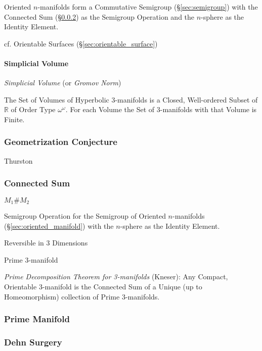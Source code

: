 Oriented $n$-manifolds form a Commutative
Semigroup (\S\ref{sec:semigroup}) with the Connected Sum
(\S\ref{sec:connected_sum}) as the Semigroup Operation and the $n$-sphere as
the Identity Element.

cf. Orientable Surfaces (\S\ref{sec:orientable_surface})



\paragraph{Simplicial Volume}\label{sec:simplicial_volume}\hfill

\emph{Simplicial Volume} (or \emph{Gromov Norm})

The Set of Volumes of Hyperbolic 3-manifolds is a Closed, Well-ordered
Subset of $\mathbb{R}$ of Order Type $\omega^\omega$. For each Volume
the Set of 3-manifolds with that Volume is Finite.



\subsubsection{Geometrization Conjecture}
\label{sec:geometrization_conjecture}

Thurston



\subsubsection{Connected Sum}\label{sec:connected_sum}

$M_1 \# M_2$

Semigroup Operation for the Semigroup of Oriented $n$-manifolds
(\S\ref{sec:oriented_manifold}) with the $n$-sphere as the Identity Element.

Reversible in 3 Dimensions

Prime 3-manifold

\emph{Prime Decomposition Theorem for 3-manifolds} (Kneser): Any Compact,
Orientable 3-manifold is the Connected Sum of a Unique (up to Homeomorphism)
collection of Prime 3-manifolds.



\subsubsection{Prime Manifold}\label{sec:prime_manifold}

\subsubsection{Dehn Surgery}\label{sec:dehn_surgery}

